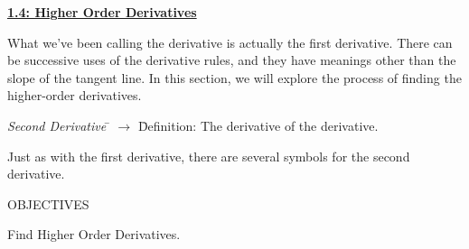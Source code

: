 \textbf{\underline{\large{1.4: Higher Order Derivatives}}} \par

What we've been calling the derivative is actually the first derivative. There can be successive uses of the derivative rules, and they have meanings other than the slope of the tangent line. In this section, we will explore the process of finding the higher-order derivatives. \par

\begin{tcolorbox}[definition]
    \begin{tabbing}
        \textit{Second Derivative} \= $\rightarrow$ \= Definition: The derivative of the derivative.
    \end{tabbing}
\end{tcolorbox}

Just as with the first derivative, there are several symbols for the second derivative. \par

\begin{center}  
\end{center} 

\begin{tcolorbox}[objective]
    \begin{center}
        OBJECTIVES \\[11pt]
    \end{center}
    Find Higher Order Derivatives.
\end{tcolorbox} \vspace{11pt}

